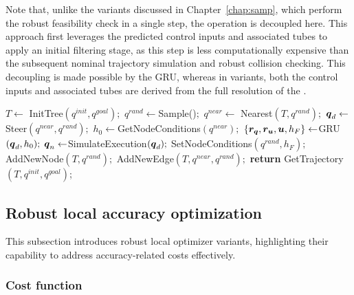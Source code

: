 Note that, unlike the  variants discussed in Chapter~\ref{chap:samp}, which perform the robust feasibility check in a single step, the operation is decoupled here. 
This approach first leverages the predicted control inputs and associated tubes to apply an initial filtering stage, as this step is less computationally expensive than the subsequent nominal trajectory simulation and robust collision checking.
This decoupling is made possible by the GRU, whereas in  variants, both the control inputs and associated tubes are derived from the full resolution of the .

\begin{algorithm}[htp]
\caption{ [$q^{init}, q^{goal}$]}\label{alg:ExtensionExample}
\begin{algorithmic}[1]
\State $T \gets$ InitTree$({q^{init}, q^{goal}});$
    \State ${q^{rand}} \gets $Sample()$;$
    \State ${q^{near}} \gets$ Nearest$(T,{q^{rand}});$
    \State $\boldsymbol{q}_d \gets$ Steer$({q^{near}},{q^{rand}});$
    \State $h_{0} \gets $GetNodeConditions$({q^{near}});$
    \State $\left \{\boldsymbol{r_q},\boldsymbol{r_u},\boldsymbol{u}, h_{F} \right \} \gets $GRU$(\boldsymbol{q}_d,h_{0});$
        \State $\boldsymbol{q}_{n} \gets $SimulateExecution$(\boldsymbol{q}_d);$
                \State SetNodeConditions$({q^{rand}}, h_{F});$
                \State AddNewNode$(T, {q^{rand}});$
                \State AddNewEdge$(T, {q^{near}}, {q^{rand}});$
        \EndIf
    \EndIf
\EndWhile
\State \textbf{return} GetTrajectory$(T, q^{init}, q^{goal})$;
\end{algorithmic}
\end{algorithm}

\subsection{Robust local accuracy optimization}\label{sec:AOptim}

This subsection introduces robust local optimizer variants, highlighting their capability to address accuracy-related costs effectively.

\subsubsection{Cost function}\label{sec:AOptimCost}

